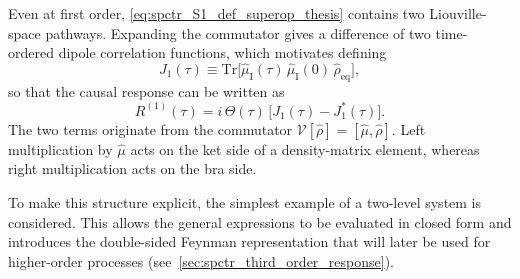 Even at first order, \autoref{eq:spctr_S1_def_superop_thesis} contains two Liouville-space pathways.
Expanding the commutator gives a difference of two time-ordered dipole correlation functions, which motivates defining
\begin{equation}
	J_{1}(\tau) \equiv \mathrm{Tr}\bigl[\hat{\mu}_{\mathrm{I}}(\tau)\,\hat{\mu}_{\mathrm{I}}(0)\,\hat{\rho}_{\mathrm{eq}}\bigr],
	\label{eq:spctr_J1_definitions}
\end{equation}
so that the causal response can be written as
\begin{equation}
	R^{(1)}(\tau) = i\,\Theta(\tau)\,\bigl[J_{1}(\tau)-J_{1}^*(\tau)\bigr].
	\label{eq:spctr_R1_J1_J1*}
\end{equation}
The two terms originate from the commutator \(\mathcal{V}[\hat{\rho}]=[\hat{\mu},\hat{\rho}]\). Left multiplication by \(\hat{\mu}\) acts on the ket side of a density-matrix element, whereas right multiplication acts on the bra side.

To make this structure explicit, the simplest example of a two-level system is considered.
This allows the general expressions to be evaluated in closed form and introduces the double-sided Feynman representation that will later be used for higher-order processes (see~\autoref{sec:spctr_third_order_response}).

